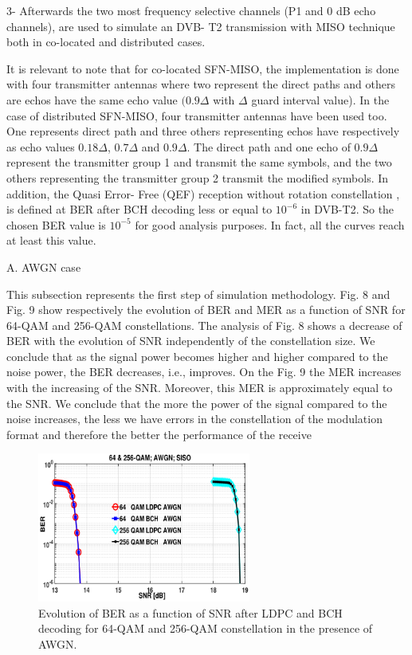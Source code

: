\documentclass[10pt, conference]{IEEEtran}
\begin{document}
\linespread{1.10}
\normalsize{
3- Afterwards the two most frequency selective channels
(P1 and 0 dB echo channels), are used to simulate an DVB-
T2 transmission with MISO technique both in co-located and
distributed cases.

It is relevant to note that for co-located SFN-MISO, the
implementation is done with four transmitter antennas where
two represent the direct paths and others are echos have
the same echo value $(0.9\Delta$ with $\Delta$ guard interval value). In
the case of distributed SFN-MISO, four transmitter antennas
have been used too. One represents direct path and three
others representing echos have respectively as echo values
$0.18\Delta$, $0.7\Delta$ and $0.9\Delta$. The direct path and one echo of
$0.9\Delta$represent the transmitter group 1 and transmit the same
symbols, and the two others representing the transmitter group
2 transmit the modified symbols. In addition, the Quasi Error-
Free (QEF) reception without rotation constellation \cite{14}, \cite{16}
is defined at BER after BCH decoding less or equal to $10^{-6}$ in
DVB-T2. So the chosen BER value is $10^{-5}$ for good analysis
purposes. In fact, all the curves reach at least this value.

\begin{adjustwidth}{0cm}{0cm}
    \textmd{ A. AWGN case}
\end{adjustwidth}

This subsection represents the first step of simulation
methodology. Fig. 8 and Fig. 9 show respectively the evolution
of BER and MER as a function of SNR for 64-QAM and
256-QAM constellations. The analysis of Fig. 8 shows a
decrease of BER with the evolution of SNR independently of
the constellation size. We conclude that as the signal power
becomes higher and higher compared to the noise power,
the BER decreases, i.e., improves. On the Fig. 9 the MER
increases with the increasing of the SNR. Moreover, this MER
is approximately equal to the SNR. We conclude that the more
the power of the signal compared to the noise increases, the
less we have errors in the constellation of the modulation
format and therefore the better the performance of the receive

\begin{figure}[!htbp]
\centering
\includegraphics[width=7cm]{images/cap1.png}
\caption{
  \textup{{\footnotesize Evolution of BER as a function of SNR after LDPC and BCH decoding
for 64-QAM and 256-QAM constellation in the presence of AWGN.
}}}
\end{figure}

}
\end{document}
